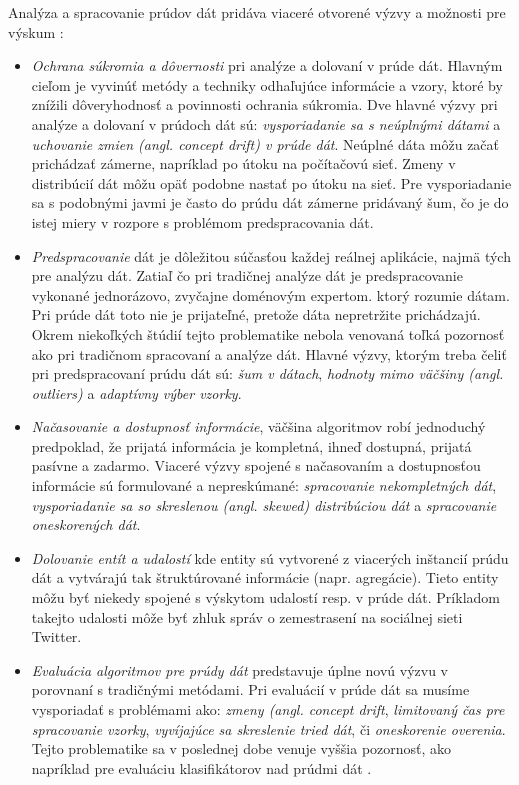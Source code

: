 Analýza a spracovanie prúdov dát pridáva viaceré otvorené výzvy a možnosti pre výskum \citep{krempl2014open}:
\begin{itemize}
	\item \textit{Ochrana súkromia a dôvernosti} pri analýze a dolovaní v prúde dát. Hlavným cieľom je vyvinúť metódy a techniky odhaľujúce informácie a vzory, ktoré by znížili dôveryhodnosť a povinnosti ochrania súkromia. Dve hlavné výzvy pri analýze a dolovaní v prúdoch dát sú: \textit{vysporiadanie sa s neúplnými dátami} a \textit{uchovanie zmien (angl. concept drift) v prúde dát}. Neúplné dáta môžu začať prichádzať zámerne, napríklad po útoku na počítačovú sieť. Zmeny v distribúcií dát môžu opäť podobne nastať po útoku na sieť. Pre vysporiadanie sa s podobnými javmi je často do prúdu dát zámerne pridávaný šum, čo je do istej miery v rozpore s problémom predspracovania dát.
	\item \textit{Predspracovanie} dát je dôležitou súčasťou každej reálnej aplikácie, najmä tých pre analýzu dát. Zatiaľ čo pri tradičnej analýze dát je predspracovanie vykonané jednorázovo, zvyčajne doménovým expertom. ktorý rozumie dátam. Pri prúde dát toto nie je prijateľné, pretože dáta nepretržite prichádzajú. Okrem niekoľkých štúdií \citep{zliobaite2014adaptive, anagnostopoulos2008deciding} tejto problematike nebola venovaná toľká pozornosť ako pri tradičnom spracovaní a analýze dát. Hlavné výzvy, ktorým treba čeliť pri predspracovaní prúdu dát sú: \textit{šum v dátach}, \textit{hodnoty mimo väčšiny (angl. outliers)} a \textit{adaptívny výber vzorky}.
	\item \textit{Načasovanie a dostupnosť informácie}, väčšina algoritmov robí jednoduchý predpoklad, že prijatá informácia je kompletná, ihneď dostupná, prijatá pasívne a zadarmo. Viaceré výzvy spojené s načasovaním a dostupnosťou informácie sú formulované a nepreskúmané: \textit{spracovanie nekompletných dát}, \textit{vysporiadanie sa so skreslenou (angl. skewed) distribúciou dát} a \textit{spracovanie oneskorených dát}.
	\item \textit{Dolovanie entít a udalostí} kde entity sú vytvorené z viacerých inštancií prúdu dát a vytvárajú tak štruktúrované informácie (napr. agregácie). Tieto entity môžu byť niekedy spojené s výskytom udalostí resp. v prúde dát. Príkladom takejto udalosti môže byť zhluk správ o zemestrasení na sociálnej sieti Twitter. 
	\item \textit{Evaluácia algoritmov pre prúdy dát} predstavuje úplne novú výzvu v porovnaní s tradičnými metódami. Pri evaluácií v prúde dát sa musíme vysporiadať s problémami ako: \textit{zmeny (angl. concept drift}, \textit{limitovaný čas pre spracovanie vzorky}, \textit{vyvíjajúce sa skreslenie tried dát}, či \textit{oneskorenie overenia}. Tejto problematike sa v poslednej dobe venuje vyššia pozornosť, ako napríklad pre evaluáciu klasifikátorov nad prúdmi dát \citep{bifet2015efficient}.

\end{itemize}
